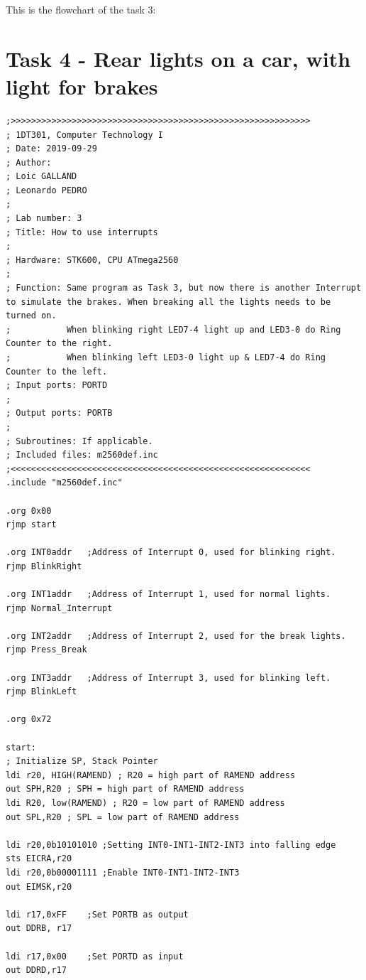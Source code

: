 \documentclass[a4paper,12pt]{article}
\begin{document}
\newpage
This is the flowchart of the task 3:
\begin{center}
\end{center}

\newpage
\section{Task 4 - Rear lights on a car, with light for brakes}

\lstset{style=Asm}
\begin{lstlisting}
;>>>>>>>>>>>>>>>>>>>>>>>>>>>>>>>>>>>>>>>>>>>>>>>>>>>>>>>>>>>
; 1DT301, Computer Technology I
; Date: 2019-09-29
; Author:
; Loic GALLAND
; Leonardo PEDRO
;
; Lab number: 3
; Title: How to use interrupts
;
; Hardware: STK600, CPU ATmega2560
;
; Function: Same program as Task 3, but now there is another Interrupt to simulate the brakes. When breaking all the lights needs to be turned on.
;			When blinking right LED7-4 light up and LED3-0 do Ring Counter to the right.
;			When blinking left LED3-0 light up & LED7-4 do Ring Counter to the left.
; Input ports: PORTD
;
; Output ports: PORTB
;
; Subroutines: If applicable.
; Included files: m2560def.inc
;<<<<<<<<<<<<<<<<<<<<<<<<<<<<<<<<<<<<<<<<<<<<<<<<<<<<<<<<<<<
.include "m2560def.inc"

.org 0x00
rjmp start

.org INT0addr	;Address of Interrupt 0, used for blinking right.
rjmp BlinkRight	

.org INT1addr	;Address of Interrupt 1, used for normal lights.
rjmp Normal_Interrupt

.org INT2addr	;Address of Interrupt 2, used for the break lights.
rjmp Press_Break

.org INT3addr	;Address of Interrupt 3, used for blinking left.
rjmp BlinkLeft

.org 0x72

start:
; Initialize SP, Stack Pointer
ldi r20, HIGH(RAMEND) ; R20 = high part of RAMEND address
out SPH,R20 ; SPH = high part of RAMEND address
ldi R20, low(RAMEND) ; R20 = low part of RAMEND address
out SPL,R20 ; SPL = low part of RAMEND address

ldi r20,0b10101010 ;Setting INT0-INT1-INT2-INT3 into falling edge
sts EICRA,r20
ldi r20,0b00001111 ;Enable INT0-INT1-INT2-INT3
out EIMSK,r20

ldi r17,0xFF	;Set PORTB as output
out DDRB, r17

ldi r17,0x00	;Set PORTD as input
out DDRD,r17


\end{lstlisting}
\end{document}
